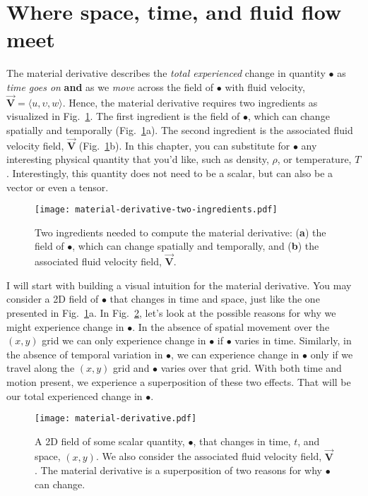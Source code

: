 \section{Where space, time, and fluid flow meet}

The material derivative describes the \textit{total experienced} change in quantity $\bullet$ as \textit{time goes on} \textbf{and} as we \textit{move} across the field of $\bullet$ with fluid velocity, $\vec{\bm{V}} = \langle u, \upsilon, w \rangle$. Hence, the material derivative requires two ingredients as visualized in Fig.~\ref{fig:material-derivative-two-ingredients}. The first ingredient is the field of $\bullet$, which can change spatially and temporally (Fig.~\ref{fig:material-derivative-two-ingredients}a). The second ingredient is the associated fluid velocity field, $\vec{\bm{V}}$ (Fig.~\ref{fig:material-derivative-two-ingredients}b). In this chapter, you can substitute for $\bullet$ any interesting physical quantity that you'd like, such as density, $\rho$, or temperature, $T$. Interestingly, this quantity does not need to be a scalar, but can also be a vector or even a tensor.
\begin{figure}[H]
\centering\texttt{[image: material-derivative-two-ingredients.pdf]}
\caption{Two ingredients needed to compute the material derivative: (\textbf{a}) the field of $\bullet$, which can change spatially and temporally, and (\textbf{b}) the associated fluid velocity field, $\vec{\bm{V}}$.}
\label{fig:material-derivative-two-ingredients}
\end{figure}

I will start with building a visual intuition for the material derivative. You may consider a 2D field of $\bullet$ that changes in time and space, just like the one presented in Fig.~\ref{fig:material-derivative-two-ingredients}a. In Fig.~\ref{fig:material-derivative-example}, let's look at the possible reasons for why we might experience change in $\bullet$. In the absence of spatial movement over the $(x,y)$ grid we can only experience change in $\bullet$ if $\bullet$ varies in time. Similarly, in the absence of temporal variation in $\bullet$, we can experience change in $\bullet$ only if we travel along the $(x,y)$ grid and $\bullet$ varies over that grid. With both time and motion present, we experience a superposition of these two effects. That will be our total experienced change in $\bullet$.
\begin{figure}[H]
\centering\texttt{[image: material-derivative.pdf]}
\caption{A 2D field of some scalar quantity, $\bullet$, that changes in time, $t$, and space, $(x, y)$. We also consider the associated fluid velocity field, $\vec{\bm{V}}$. The material derivative is a superposition of two reasons for why $\bullet$ can change.}			
\label{fig:material-derivative-example}
\end{figure}

